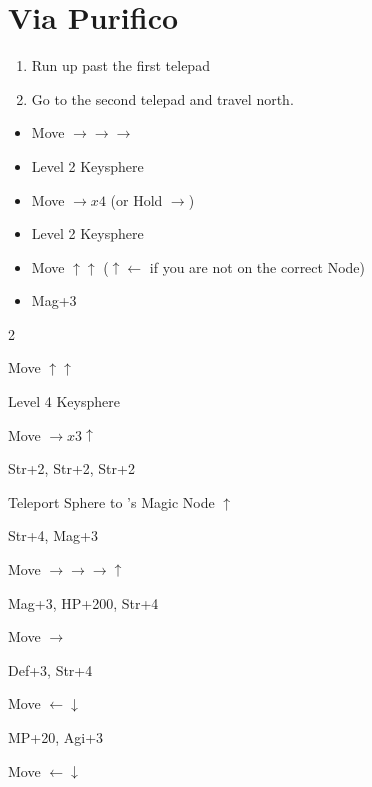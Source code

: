 \chapter{Via Purifico}

\begin{enumerate}
    \item Run up past the first telepad
    \item Go to the second telepad and travel north.
\end{enumerate}
\begin{spheregrid}
    \begin{itemize}
        \auronf
        \begin{itemize}
            \item Move $\rightarrow\rightarrow\rightarrow$
            \item Level 2 Keysphere
            \item Move $\rightarrow x4$ (or Hold $\rightarrow$)
            \item Level 2 Keysphere
            \item Move $\uparrow\uparrow$ ($\uparrow\leftarrow$ if you are not on the correct Node)
            \item Mag+3
        \end{itemize}
        \yunaf
        \begin{itemize}
            \begin{multicols}{2}
                \item Move $\uparrow\uparrow$
                \item Level 4 Keysphere
                \item Move $\rightarrow x3 \uparrow$
                \item Str+2, Str+2, Str+2
                \item Teleport Sphere to \auron's Magic Node $\uparrow$
                \item Str+4, Mag+3
                \item Move $\rightarrow\rightarrow\rightarrow\uparrow$
                \item Mag+3, HP+200, Str+4
                \item Move $\rightarrow$
                \item Def+3, Str+4
                \item Move $\leftarrow\downarrow$
                \item MP+20, Agi+3
                \item Move $\leftarrow\downarrow$

\end{multicols}
\end{itemize}
\end{itemize}
\end{spheregrid}
